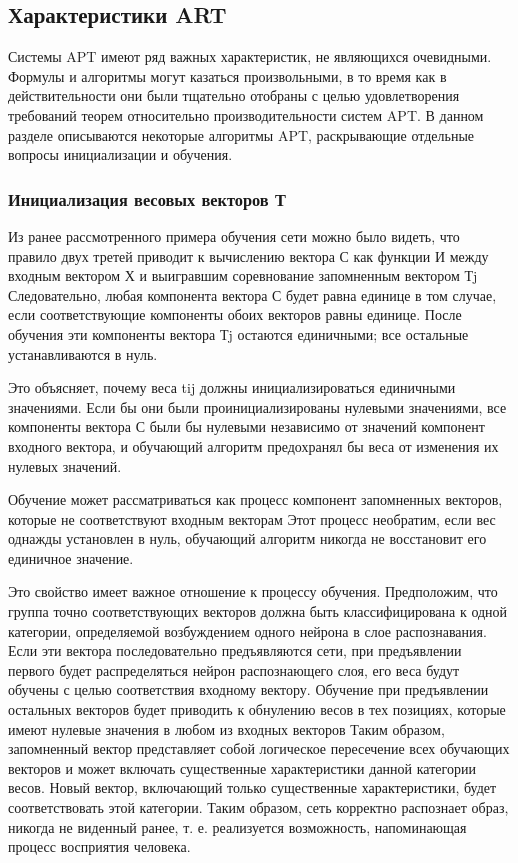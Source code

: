 \documentclass[14pt,a4paper,report]{article}
\begin{document}
\subsection{Характеристики ART}

Системы APT имеют ряд важных характеристик, не являющихся очевидными. Формулы и алгоритмы могут казаться произвольными, в то время как в действительности они были тщательно отобраны с целью удовлетворения требований теорем относительно производительности систем APT. В данном разделе описываются некоторые алгоритмы APT, раскрывающие отдельные вопросы инициализации и обучения.

\subsubsection{Инициализация весовых векторов Т}

Из ранее рассмотренного примера обучения сети можно было видеть, что правило двух третей приводит к вычислению вектора С как функции И между входным вектором Х и выигравшим соревнование запомненным вектором Тj \cite{cite-techn-adapt} Следовательно, любая компонента вектора С будет равна единице в том случае, если соответствующие компоненты обоих векторов равны единице. После обучения эти компоненты вектора Тj остаются единичными; все остальные устанавливаются в нуль.

Это объясняет, почему веса tij должны инициализироваться единичными значениями. Если бы они были проинициализированы нулевыми значениями, все компоненты вектора С были бы нулевыми независимо от значений компонент входного вектора, и обучающий алгоритм предохранял бы веса от изменения их нулевых значений.

Обучение может рассматриваться как процесс  компонент запомненных векторов, которые не соответствуют входным векторам \cite{cite-kgeu-adapt} Этот процесс необратим, если вес однажды установлен в нуль, обучающий алгоритм никогда не восстановит его единичное значение.

Это свойство имеет важное отношение к процессу обучения. Предположим, что группа точно соответствующих векторов должна быть классифицирована к одной категории, определяемой возбуждением одного нейрона в слое распознавания. Если эти вектора последовательно предъявляются сети, при предъявлении первого будет распределяться нейрон распознающего слоя, его веса будут обучены с целью соответствия входному вектору. Обучение при предъявлении остальных векторов будет приводить к обнулению весов в тех позициях, которые имеют нулевые значения в любом из входных векторов \cite{cite-techn-adapt} Таким образом, запомненный вектор представляет собой логическое пересечение всех обучающих векторов и может включать существенные характеристики данной категории весов. Новый вектор, включающий только существенные характеристики, будет соответствовать этой категории. Таким образом, сеть корректно распознает образ, никогда не виденный ранее, т. е. реализуется возможность, напоминающая процесс восприятия человека.
\end{document}
